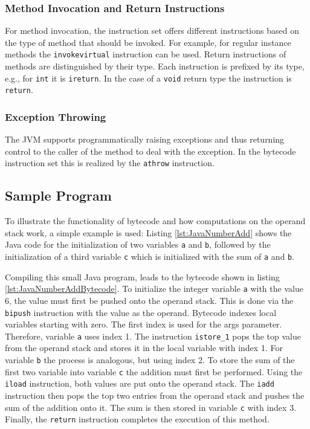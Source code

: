 \subsubsection{Method Invocation and Return Instructions}

For method invocation, the instruction set offers different instructions based on the type of method that should be invoked. For example, for regular instance methods the \texttt{invokevirtual} instruction can be used. Return instructions of methods are distinguished by their type. Each instruction is prefixed by its type, e.g., for \texttt{int} it is \texttt{ireturn}. In the case of a \texttt{void} return type the instruction is \texttt{return}. 

\subsubsection{Exception Throwing}

The JVM supports programmatically raising exceptions and thus returning control to the caller of the method to deal with the exception. In the bytecode instruction set this is realized by the \texttt{athrow} instruction.  

\subsection{Sample Program}

To illustrate the functionality of bytecode and how computations on the operand stack work, a simple example is used: Listing \ref{lst:JavaNumberAdd} shows the Java code for the initialization of two variables \texttt{a} and \texttt{b},  followed by the initialization of a third variable \texttt{c} which is initialized with the sum of \texttt{a} and \texttt{b}.

Compiling this small Java program, leads to the bytecode shown in listing \ref{lst:JavaNumberAddBytecode}. To initialize the integer variable \texttt{a} with the value 6, the value must first be pushed onto the operand stack. This is done via the \texttt{bipush} instruction with the value as the operand. Bytecode indexes local variables starting with zero. The first index is used for the args parameter. Therefore, variable \texttt{a} uses index 1. The instruction \verb|istore_1| pops the top value from the operand stack and stores it in the local variable with index 1. For variable \texttt{b} the process is analogous, but using index 2. To store the sum of the first two variable into variable \verb|c| the addition must first be performed. Using the \verb|iload| instruction, both values are put onto the operand stack. The \verb|iadd| instruction then pops the top two entries from the operand stack and pushes the sum of the addition onto it. The sum is then stored in variable \verb|c| with index 3. Finally, the \texttt{return} instruction completes the execution of this method.  

